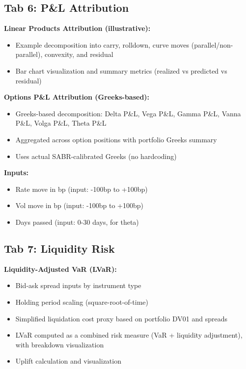 \documentclass[12pt,a4paper]{report}
\begin{document}
\subsection{Tab 6: P\&L Attribution}

\textbf{Linear Products Attribution (illustrative):}
\begin{itemize}
    \item Example decomposition into carry, rolldown, curve moves (parallel/non-parallel), convexity, and residual
    \item Bar chart visualization and summary metrics (realized vs predicted vs residual)
\end{itemize}

\textbf{Options P\&L Attribution (Greeks-based):}
\begin{itemize}
    \item Greeks-based decomposition: Delta P\&L, Vega P\&L, Gamma P\&L, Vanna P\&L, Volga P\&L, Theta P\&L
    \item Aggregated across option positions with portfolio Greeks summary
    \item Uses actual SABR-calibrated Greeks (no hardcoding)
\end{itemize}

\textbf{Inputs:}
\begin{itemize}
    \item Rate move in bp (input: -100bp to +100bp)
    \item Vol move in bp (input: -100bp to +100bp)
    \item Days passed (input: 0-30 days, for theta)
\end{itemize}

\subsection{Tab 7: Liquidity Risk}

\textbf{Liquidity-Adjusted VaR (LVaR):}
\begin{itemize}
    \item Bid-ask spread inputs by instrument type
    \item Holding period scaling (square-root-of-time)
    \item Simplified liquidation cost proxy based on portfolio DV01 and spreads
    \item LVaR computed as a combined risk measure (VaR + liquidity adjustment), with breakdown visualization
    \item Uplift calculation and visualization
\end{itemize}
\end{document}
